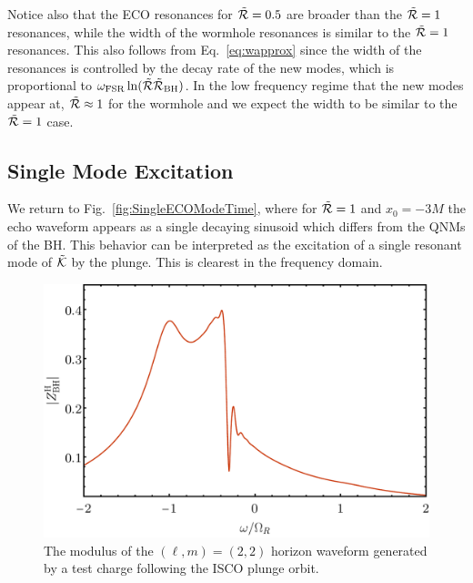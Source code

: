 \begin{refsection}
Notice also that the \rm{ECO} resonances for $\tilde{\mathcal R} = 0.5$ are broader than the $\tilde{\mathcal R}=1$ resonances, while the width of the wormhole resonances is similar to the $\tilde{\mathcal R}=1$ resonances. 
This also follows from Eq.~\eqref{eq:wapprox} since the width of the resonances is controlled by the decay rate of the new modes, which is proportional to $\omega_{\rm FSR}\ln(\tilde{\mathcal R}\tilde{\mathcal R}_{\rm BH})$. In the low frequency regime that the new modes appear at, $\tilde{\mathcal R}\approx 1$ for the wormhole and we expect the width to be similar to the $\tilde{\mathcal R}=1$ case.

\subsection{Single Mode Excitation}
\label{sec:SingleMode}

We return to Fig.~\ref{fig:SingleECOModeTime}, where for $\tilde{\mathcal R} = 1$ and $x_0 = -3 M$ the echo waveform appears as a single decaying sinusoid which differs from the QNMs of the BH.
This behavior can be interpreted as the excitation of a single resonant mode of $\tilde{\mathcal K}$ by the plunge.
This is clearest in the frequency domain.

\begin{figure}[t]
\includegraphics[width = 1 \columnwidth]{chapter_echo/etc/horizonwaveplot}
\caption{
The modulus of the $(\ell,m)=(2,2)$ horizon waveform generated by a test charge following the ISCO plunge orbit.
}
\label{fig:HorizonFT}
\end{figure}


\end{refsection}
